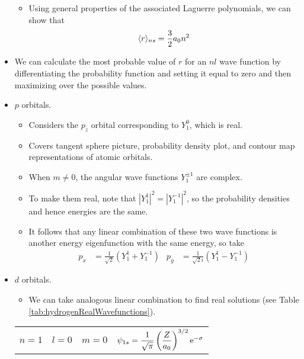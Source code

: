 \documentclass[../notes.tex]{subfiles}
\begin{document}
\begin{itemize}
\begin{equation*}
    \end{equation*}
    \begin{itemize}
        \item Using general properties of the associated Laguerre polynomials, we can show that
        \begin{equation*}
            \prb{r}_{ns} = \frac{3}{2}a_0n^2
        \end{equation*}
    \end{itemize}
    \item We can calculate the most probable value of $r$ for an $nl$ wave function by differentiating the probability function and setting it equal to zero and then maximizing over the possible values.
    \item $p$ orbitals.
    \begin{itemize}
        \item Considers the $p_z$ orbital corresponding to $Y_1^0$, which is real.
        \item Covers tangent sphere picture, probability density plot, and contour map representations of atomic orbitals.
        \item When $m\neq 0$, the angular wave functions $Y_1^{\pm 1}$ are complex.
        \item To make them real, note that $|Y_1^1|^2=|Y_1^{-1}|^2$, so the probability densities and hence energies are the same.
        \item It follows that any linear combination of these two wave functions is another energy eigenfunction with the same energy, so take
        \begin{align*}
            p_x &= \frac{1}{\sqrt{2}}(Y_1^1+Y_1^{-1})&
            p_y &= \frac{1}{\sqrt{2}i}(Y_1^1-Y_1^{-1})
        \end{align*}
    \end{itemize}
    \item $d$ orbitals.
    \begin{itemize}
        \item We can take analogous linear combination to find real solutions (see Table \ref{tab:hydrogenRealWavefunctions}).
    \end{itemize}
    \begin{table}[h!]
        \centering
        \small
        \renewcommand{\arraystretch}{2.5}
        \begin{tabular}{llll}
            \toprule
            $n=1$ & $l=0$ & $m=0$ & $\psi_{1s}=\dfrac{1}{\sqrt{\pi}}\left( \dfrac{Z}{a_0} \right)^{3/2}\e[-\sigma]$\\

\end{tabular}
\end{table}
\end{itemize}
\end{document}
